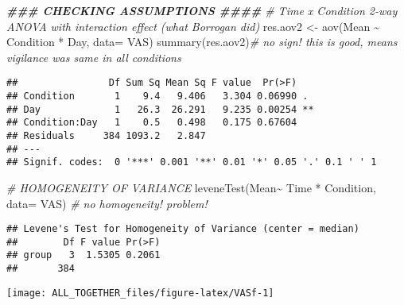 \documentclass[
]{article}
\newenvironment{Shaded}{\begin{snugshade}}{\end{snugshade}}
\newcommand{\AttributeTok}[1]{\textcolor[rgb]{0.77,0.63,0.00}{#1}}
\newcommand{\CommentTok}[1]{\textcolor[rgb]{0.56,0.35,0.01}{\textit{#1}}}
\newcommand{\DecValTok}[1]{\textcolor[rgb]{0.00,0.00,0.81}{#1}}
\newcommand{\DocumentationTok}[1]{\textcolor[rgb]{0.56,0.35,0.01}{\textbf{\textit{#1}}}}
\newcommand{\FunctionTok}[1]{\textcolor[rgb]{0.00,0.00,0.00}{#1}}
\newcommand{\NormalTok}[1]{#1}
\newcommand{\OtherTok}[1]{\textcolor[rgb]{0.56,0.35,0.01}{#1}}
\newcommand{\SpecialCharTok}[1]{\textcolor[rgb]{0.00,0.00,0.00}{#1}}
\begin{document}
\begin{Shaded}
\begin{Highlighting}[]
\DocumentationTok{\#\#\# CHECKING ASSUMPTIONS \#\#\#\#}
\CommentTok{\# Time x Condition 2{-}way ANOVA with interaction effect (what Borrogan did)}
\NormalTok{res.aov2 }\OtherTok{\textless{}{-}} \FunctionTok{aov}\NormalTok{(Mean }\SpecialCharTok{\textasciitilde{}}\NormalTok{ Condition }\SpecialCharTok{*}\NormalTok{ Day, }\AttributeTok{data=}\NormalTok{ VAS)}
\FunctionTok{summary}\NormalTok{(res.aov2)}\CommentTok{\# no sign! this is good, means vigilance was same in all conditions}
\end{Highlighting}
\end{Shaded}

\begin{verbatim}
##                Df Sum Sq Mean Sq F value  Pr(>F)   
## Condition       1    9.4   9.406   3.304 0.06990 . 
## Day             1   26.3  26.291   9.235 0.00254 **
## Condition:Day   1    0.5   0.498   0.175 0.67604   
## Residuals     384 1093.2   2.847                   
## ---
## Signif. codes:  0 '***' 0.001 '**' 0.01 '*' 0.05 '.' 0.1 ' ' 1
\end{verbatim}

\begin{Shaded}
\begin{Highlighting}[]
\CommentTok{\# HOMOGENEITY OF VARIANCE}
\FunctionTok{leveneTest}\NormalTok{(Mean}\SpecialCharTok{\textasciitilde{}}\NormalTok{ Time }\SpecialCharTok{*}\NormalTok{ Condition, }\AttributeTok{data=}\NormalTok{ VAS) }\CommentTok{\# no homogeneity! problem! }
\end{Highlighting}
\end{Shaded}

\begin{verbatim}
## Levene's Test for Homogeneity of Variance (center = median)
##        Df F value Pr(>F)
## group   3  1.5305 0.2061
##       384
\end{verbatim}

\begin{Shaded}
\end{Shaded}

\texttt{[image: ALL\_TOGETHER\_files/figure-latex/VASf-1]}
\end{document}
